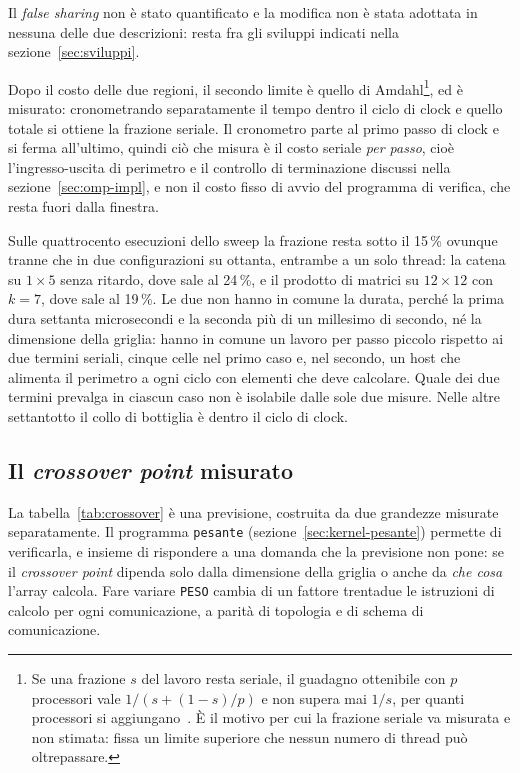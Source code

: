 Il \emph{false sharing} non è stato quantificato e la modifica non è stata
adottata in nessuna delle due descrizioni: resta fra gli sviluppi indicati
nella sezione~\ref{sec:sviluppi}.

Dopo il costo delle due regioni, il secondo limite è quello di
Amdahl\footnote{Se una frazione $s$ del lavoro resta
seriale, il guadagno ottenibile con $p$ processori vale $1/(s + (1-s)/p)$ e non
supera mai $1/s$, per quanti processori si aggiungano~\cite{Amdahl}. È il motivo
per cui la frazione seriale va misurata e non stimata: fissa un limite superiore
che nessun numero di thread può oltrepassare.}, ed è misurato:
cronometrando separatamente il tempo dentro il ciclo di clock e quello totale si
ottiene la frazione seriale. Il cronometro parte al primo passo di clock e si
ferma all'ultimo, quindi ciò che misura è il costo seriale \emph{per passo},
cioè l'ingresso-uscita di perimetro e il controllo di terminazione discussi
nella sezione~\ref{sec:omp-impl}, e non il costo fisso di avvio del programma
di verifica, che resta fuori dalla finestra.

Sulle quattrocento esecuzioni dello sweep la frazione resta sotto il 15\,\%
ovunque tranne che in due configurazioni su ottanta, entrambe a un solo thread:
la catena su $1\times5$ senza ritardo, dove sale al 24\,\%, e il prodotto di
matrici su $12\times12$ con $k=7$, dove sale al 19\,\%. Le due non hanno in
comune la durata, perché la prima dura settanta microsecondi e la seconda più
di un millesimo di secondo, né la dimensione della griglia: hanno in comune un
lavoro per passo piccolo rispetto ai due termini seriali, cinque celle nel
primo caso e, nel secondo, un host che alimenta il perimetro a ogni ciclo con
elementi che deve calcolare. Quale dei due termini prevalga in ciascun caso non
è isolabile dalle sole due misure. Nelle altre settantotto il collo di
bottiglia è dentro il ciclo di clock.

\subsection{Il \emph{crossover point} misurato}
\label{sec:crossover}

La tabella~\ref{tab:crossover} è una previsione, costruita da due grandezze
misurate separatamente. Il programma \texttt{pesante}
(sezione~\ref{sec:kernel-pesante}) permette di verificarla, e insieme di
rispondere a una domanda che la previsione non pone: se il \emph{crossover point} dipenda
solo dalla dimensione della griglia o anche da \emph{che cosa} l'array calcola.
Fare variare \texttt{PESO} cambia di un fattore trentadue le istruzioni di
calcolo per ogni comunicazione, a parità di topologia e di schema di
comunicazione.

